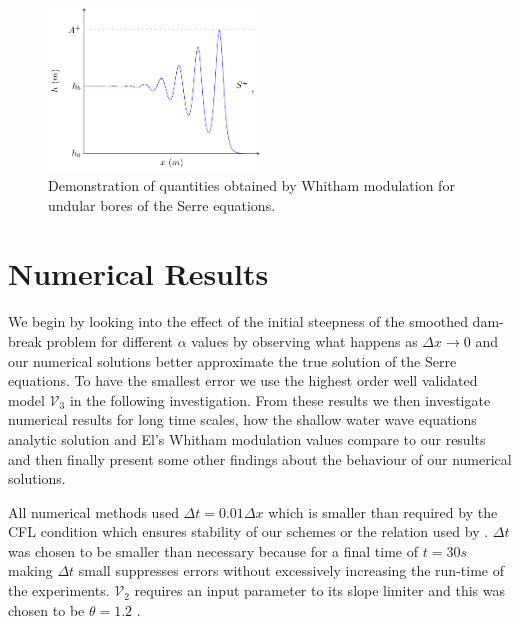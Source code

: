 \documentclass[times]{elsarticle}
\begin{document}
\begin{figure}
\centering
\includegraphics[width=0.5\textwidth]{pics/explainers/SERREex.pdf}
\caption{Demonstration of quantities obtained by Whitham modulation for undular bores of the Serre equations.}
\label{fig:Serreanadiagram}
\end{figure}



\section{Numerical Results}
\label{section:NumRes}
We begin by looking into the effect of the initial steepness of the smoothed dam-break problem for different $\alpha$ values by observing what happens as $\Delta x \rightarrow 0$ and our numerical solutions better approximate the true solution of the Serre equations. To have the smallest error we use the highest order well validated model $\mathcal{V}_3$ in the following investigation. From these results we then investigate numerical results for long time scales, how the shallow water wave equations analytic solution and El's Whitham modulation values compare to our results and then finally present some other findings about the behaviour of our numerical solutions. 

All numerical methods used $\Delta t = 0.01 \Delta x$ which is smaller than required by the CFL condition \cite{Harten-etal-1983-357} which ensures stability of our schemes or the relation used by \citet{El-etal-2006}. $\Delta t$ was chosen to be smaller than necessary because for a final time of $t=30s$ making $\Delta t$ small suppresses errors without excessively increasing the run-time of the experiments. $\mathcal{V}_2$ requires an input parameter to its slope limiter and this was chosen to be $\theta = 1.2$ \cite{Zoppou-etal-2017}. 
\end{document}
